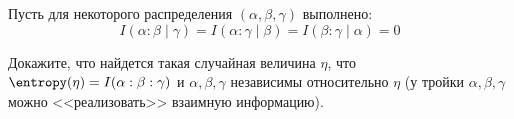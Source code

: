 Пусть для некоторого распределения $(\alpha, \beta, \gamma)$ выполнено:
$$
    I(\alpha : \beta \mid \gamma) = I(\alpha : \gamma \mid \beta) = I(\beta : \gamma \mid \alpha) = 0
$$

Докажите, что найдется такая случайная величина $\eta$, что $\entropy(\eta) = I(\alpha : \beta : \gamma)$ и
$\alpha, \beta, \gamma$ независимы относительно $\eta$ (у тройки $\alpha, \beta, \gamma$ можно
<<реализовать>> взаимную информацию).